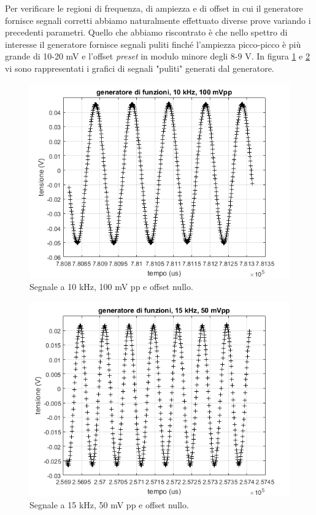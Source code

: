 \documentclass[journal, a4paper]{IEEEtran}
\begin{document}
Per verificare le regioni di frequenza, di ampiezza e di offset in cui il generatore fornisce segnali corretti abbiamo naturalmente effettuato diverse prove variando i precedenti parametri.
Quello che abbiamo riscontrato è che nello spettro di interesse il generatore fornisce segnali puliti finché l'ampiezza picco-picco è più grande di 10-20 mV e l'offset \textit{preset} in modulo minore degli 8-9 V. In figura \ref{fig:prova_gen_10khz_100mpp} e \ref{fig:prova_gen_15khz_50mpp} vi sono rappresentati i grafici di segnali "puliti" generati dal generatore.

\begin{figure}[htp]
\centering
\includegraphics[scale=.4]{prova_gen_10khz_100mpp}
\caption{Segnale a 10 kHz, 100 mV pp e offset nullo.}
\label{fig:prova_gen_10khz_100mpp}
\end{figure}

\begin{figure}[htp]
\centering
\includegraphics[scale=.4]{prova_gen_15khz_50mpp}
\caption{Segnale a 15 kHz, 50 mV pp e offset nullo.}
\label{fig:prova_gen_15khz_50mpp}
\end{figure}
\end{document}
